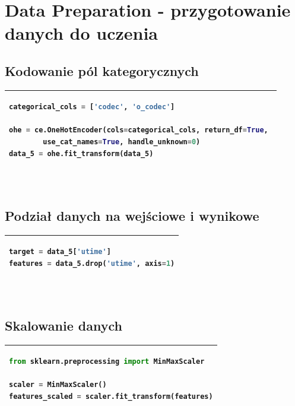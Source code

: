 \documentclass[11pt, a4paper]{article}
\begin{document}
\newpage
\section{Data Preparation - przygotowanie danych do uczenia}
\subsection{Kodowanie pól kategorycznych}
    \vspace{0.5cm} 
    \begin{tabular}{|l|}
        \hline
        \begin{lstlisting}[language=Python]
categorical_cols = ['codec', 'o_codec']

ohe = ce.OneHotEncoder(cols=categorical_cols, return_df=True, 
        use_cat_names=True, handle_unknown=0)
data_5 = ohe.fit_transform(data_5)
        \end{lstlisting}
        \\ \hline
    \end{tabular}
    \vspace{0.5cm} \\

\subsection{Podział danych na wejściowe i wynikowe }

    \vspace{0.5cm} 
    \begin{tabular}{|l|}
        \hline
        \begin{lstlisting}[language=Python]
target = data_5['utime']
features = data_5.drop('utime', axis=1)
        \end{lstlisting}
        \\ \hline
    \end{tabular}
    \vspace{0.5cm} \\

\subsection{Skalowanie danych}

    \vspace{0.5cm} 
    \begin{tabular}{|l|}
        \hline
        \begin{lstlisting}[language=Python]
from sklearn.preprocessing import MinMaxScaler

scaler = MinMaxScaler()
features_scaled = scaler.fit_transform(features)
        \end{lstlisting}
        \\ \hline
    \end{tabular}
    \vspace{0.5cm} \\
\end{document}
